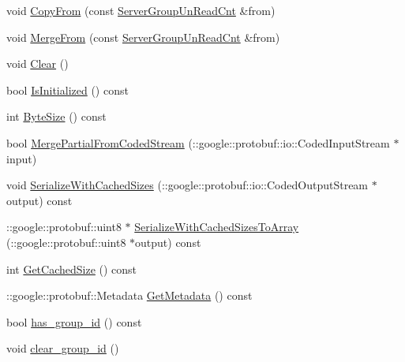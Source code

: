 \begin{DoxyCompactItemize}
\item 
void \hyperlink{class_i_m_1_1_base_define_1_1_server_group_un_read_cnt_ad6a392669003467732b90be6997d3d03}{Copy\+From} (const \hyperlink{class_i_m_1_1_base_define_1_1_server_group_un_read_cnt}{Server\+Group\+Un\+Read\+Cnt} \&from)
\item 
void \hyperlink{class_i_m_1_1_base_define_1_1_server_group_un_read_cnt_a4ebdbb92698b2918f751a7aa3722c88a}{Merge\+From} (const \hyperlink{class_i_m_1_1_base_define_1_1_server_group_un_read_cnt}{Server\+Group\+Un\+Read\+Cnt} \&from)
\item 
void \hyperlink{class_i_m_1_1_base_define_1_1_server_group_un_read_cnt_a25c940a52e1471005424cf7ffd7b01f7}{Clear} ()
\item 
bool \hyperlink{class_i_m_1_1_base_define_1_1_server_group_un_read_cnt_ad97c8e2272da8721b8ee53b4f88bccf8}{Is\+Initialized} () const 
\item 
int \hyperlink{class_i_m_1_1_base_define_1_1_server_group_un_read_cnt_a4cc829b6c4579fd99df30e051f0999ff}{Byte\+Size} () const 
\item 
bool \hyperlink{class_i_m_1_1_base_define_1_1_server_group_un_read_cnt_a6a031b1f836651bd6ae24ef5c529d4b8}{Merge\+Partial\+From\+Coded\+Stream} (\+::google\+::protobuf\+::io\+::\+Coded\+Input\+Stream $\ast$input)
\item 
void \hyperlink{class_i_m_1_1_base_define_1_1_server_group_un_read_cnt_a4eacc44f706218da2897c9f1a6db0403}{Serialize\+With\+Cached\+Sizes} (\+::google\+::protobuf\+::io\+::\+Coded\+Output\+Stream $\ast$output) const 
\item 
\+::google\+::protobuf\+::uint8 $\ast$ \hyperlink{class_i_m_1_1_base_define_1_1_server_group_un_read_cnt_ac75b9724bc3e7ac6a98ffe60dd2aff44}{Serialize\+With\+Cached\+Sizes\+To\+Array} (\+::google\+::protobuf\+::uint8 $\ast$output) const 
\item 
int \hyperlink{class_i_m_1_1_base_define_1_1_server_group_un_read_cnt_a5c3bf5018ee8b3907e3e28f153e96d8e}{Get\+Cached\+Size} () const 
\item 
\+::google\+::protobuf\+::\+Metadata \hyperlink{class_i_m_1_1_base_define_1_1_server_group_un_read_cnt_a6d9a9cb38ad20f76497130986950ad2a}{Get\+Metadata} () const 
\item 
bool \hyperlink{class_i_m_1_1_base_define_1_1_server_group_un_read_cnt_a50e338a67c4188961b1d28b984224c96}{has\+\_\+group\+\_\+id} () const 
\item 
void \hyperlink{class_i_m_1_1_base_define_1_1_server_group_un_read_cnt_ab264dd5808ad1159eae59798345e8878}{clear\+\_\+group\+\_\+id} ()

\end{DoxyCompactItemize}
